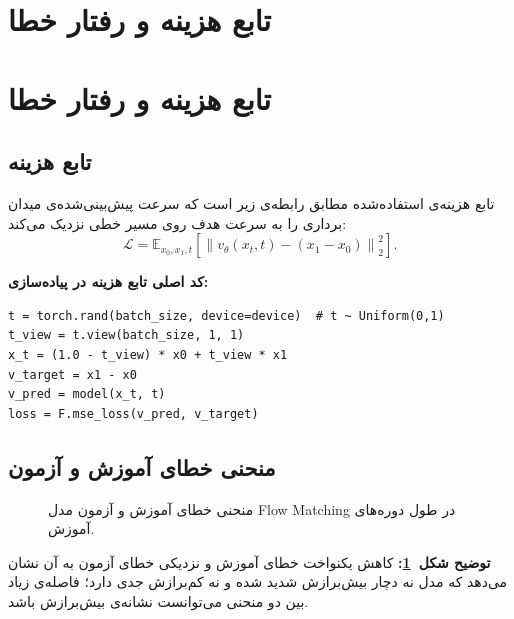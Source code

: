\section{تابع هزینه و رفتار خطا}

\section{تابع هزینه و رفتار خطا}

\subsection{تابع هزینه}
تابع هزینه‌ی استفاده‌شده مطابق رابطه‌ی زیر است که سرعت پیش‌بینی‌شده‌ی میدان برداری را به سرعت هدف
روی مسیر خطی  نزدیک می‌کند:
\begin{equation}
\mathcal{L} = \mathbb{E}_{x_0, x_1, t} \left[ \left\| v_\theta(x_t, t) - (x_1 - x_0) \right\|_2^2 \right].
\end{equation}

\noindent\textbf{کد اصلی تابع هزینه در پیاده‌سازی:}
\begin{verbatim}
t = torch.rand(batch_size, device=device)  # t ~ Uniform(0,1)
t_view = t.view(batch_size, 1, 1)
x_t = (1.0 - t_view) * x0 + t_view * x1
v_target = x1 - x0
v_pred = model(x_t, t)
loss = F.mse_loss(v_pred, v_target)
\end{verbatim}

\subsection{منحنی خطای آموزش و آزمون}

\begin{figure}[H]
	\centering
	\caption{منحنی خطای آموزش و آزمون مدل Flow Matching در طول دوره‌های آموزش.}
	\label{fig:fm-loss}
\end{figure}

\noindent\textbf{توضیح شکل~\ref{fig:fm-loss}:}
کاهش یکنواخت خطای آموزش و نزدیکی خطای آزمون به آن نشان می‌دهد که مدل نه دچار بیش‌برازش شدید شده و نه کم‌برازش جدی دارد؛ فاصله‌ی زیاد بین دو منحنی می‌توانست نشانه‌ی بیش‌برازش باشد.

